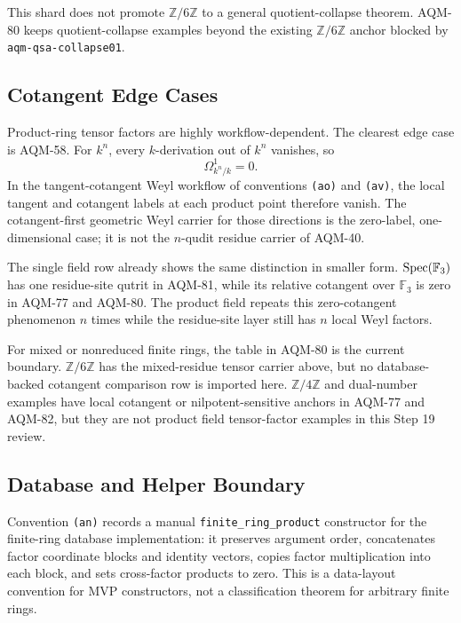 This shard does not promote \(\mathbb Z/6\mathbb Z\) to a general
quotient-collapse theorem.  AQM-80 keeps quotient-collapse examples beyond
the existing \(\mathbb Z/6\mathbb Z\) anchor blocked by
\texttt{aqm-qsa-collapse01}.

\subsection{Cotangent Edge Cases}

Product-ring tensor factors are highly workflow-dependent.  The clearest
edge case is AQM-58.  For \(k^n\), every \(k\)-derivation out of \(k^n\)
vanishes, so
\[
  \Omega^1_{k^n/k}=0.
\]
In the tangent-cotangent Weyl workflow of conventions \texttt{(ao)} and
\texttt{(av)}, the local tangent and cotangent labels at each product point
therefore vanish.  The cotangent-first geometric Weyl carrier for those
directions is the zero-label, one-dimensional case; it is not the
\(n\)-qudit residue carrier of AQM-40.

The single field row already shows the same distinction in smaller form.
\(\operatorname{Spec}(\mathbb F_3)\) has one residue-site qutrit in AQM-81, while its
relative cotangent over \(\mathbb F_3\) is zero in AQM-77 and AQM-80.  The
product field repeats this zero-cotangent phenomenon \(n\) times while the
residue-site layer still has \(n\) local Weyl factors.

For mixed or nonreduced finite rings, the table in AQM-80 is the current
boundary.  \(\mathbb Z/6\mathbb Z\) has the mixed-residue tensor carrier
above, but no database-backed cotangent comparison row is imported here.
\(\mathbb Z/4\mathbb Z\) and dual-number examples have local cotangent or
nilpotent-sensitive anchors in AQM-77 and AQM-82, but they are not product
field tensor-factor examples in this Step 19 review.

\subsection{Database and Helper Boundary}

Convention \texttt{(an)} records a manual
\texttt{finite\_ring\_product} constructor for the finite-ring database
implementation: it preserves argument order, concatenates factor coordinate
blocks and identity vectors, copies factor multiplication into each block,
and sets cross-factor products to zero.  This is a data-layout convention for
MVP constructors, not a classification theorem for arbitrary finite rings.

